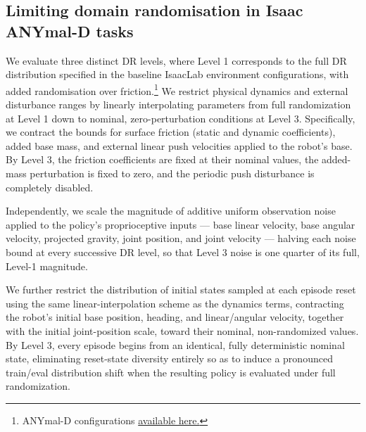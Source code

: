 \documentclass{article} %
\begin{document}
    \subsection{Limiting domain randomisation in Isaac ANYmal-D tasks}
        We evaluate three distinct DR levels, where Level 1 corresponds to the full DR distribution specified in the baseline IsaacLab environment configurations, with added randomisation over friction.\footnote{ANYmal-D configurations \href{https://github.com/isaac-sim/IsaacLab/blob/release/3.0.0-beta2/source/isaaclab_tasks/isaaclab_tasks/manager_based/locomotion/velocity/velocity_env_cfg.py}{available here.}} 
        We restrict physical dynamics and external disturbance ranges by linearly interpolating parameters from full randomization at Level 1 down to nominal, zero-perturbation conditions at Level 3. Specifically, we contract the bounds for surface friction (static and dynamic coefficients), added base mass, and external linear push velocities applied to the robot's base. By Level 3, the friction coefficients are fixed at their nominal values, the added-mass perturbation is fixed to zero, and the periodic push disturbance is completely disabled.

        Independently, we scale the magnitude of additive uniform observation noise applied to the policy's proprioceptive inputs — base linear velocity, base angular velocity, projected gravity, joint position, and joint velocity — halving each noise bound at every successive DR level, so that Level 3 noise is one quarter of its full, Level-1 magnitude.
        
        We further restrict the distribution of initial states sampled at each episode reset using the same linear-interpolation scheme as the dynamics terms, contracting the robot's initial base position, heading, and linear/angular velocity, together with the initial joint-position scale, toward their nominal, non-randomized values. By Level 3, every episode begins from an identical, fully deterministic nominal state, eliminating reset-state diversity entirely so as to induce a pronounced train/eval distribution shift when the resulting policy is evaluated under full randomization.
        
\end{document}
